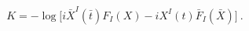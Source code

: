 \begin{equation}\label{Kspec}
K=-\log \Big[i \bar{X}^{I} (\bar t) F_{I}(X) - i X^{I}
(t)\bar{F}_{I}(\bar{X})\Big] \ .
\end{equation}

